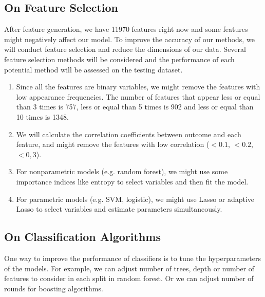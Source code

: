 \documentclass[11pt]{article}
\begin{document}
\subsection{On Feature Selection}
After feature generation, we have 11970 features right now and some features might negatively affect our model. To improve the accuracy of our methods, we will conduct feature selection and reduce the dimensions of our data. Several feature selection methods will be considered and the performance of each potential method will be assessed on the testing dataset.
\begin{enumerate}
	\item Since all the features are binary variables, we might remove the features with low appearance frequencies. The number of features that appear less or equal than 3 times is 757, less or equal than 5 times is 902 and less or equal than 10 times is 1348. 
	\item We will calculate the correlation coefficients between outcome and each feature, and might remove the features with low correlation ($<0.1$, $<0.2$, $<0,3$). 
	\item For nonparametric models (e.g. random forest), we might use some importance indices like entropy to select variables and then fit the model. 
	\item For parametric models (e.g. SVM, logistic), we might use Lasso or adaptive Lasso to select variables and estimate parameters simultaneously. 
\end{enumerate}

\subsection{On Classification Algorithms}
One way to improve the performance of classifiers is to tune the hyperparameters of the models. For example, we can adjust number of trees, depth or number of features to consider in each split in random forest. Or we can adjust number of rounds for boosting algorithms.
\end{document}
